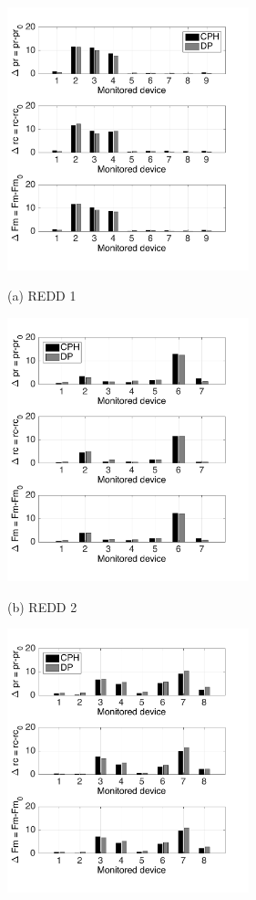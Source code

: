 \begin{figure}[htb]
\begin{minipage}[b]{0.48\linewidth}
  \centering
  \centerline{\includegraphics[width=7cm]{./chapters/chapter5/images/R1_kp_1modev.pdf}}
  \centerline{(a) REDD 1}\medskip
\end{minipage}
\hfill
\begin{minipage}[b]{.48\linewidth}
  \centering
  \centerline{\includegraphics[width=7cm]{./chapters/chapter5/images/R2_kp_1modev.pdf}}
  \centerline{(b) REDD 2}\medskip
\end{minipage}
\begin{minipage}[b]{.48\linewidth}
  \centering
  \centerline{\includegraphics[width=7cm]{./chapters/chapter5/images/UK_kp_1modev.pdf}}

\end{minipage}
\end{figure}

